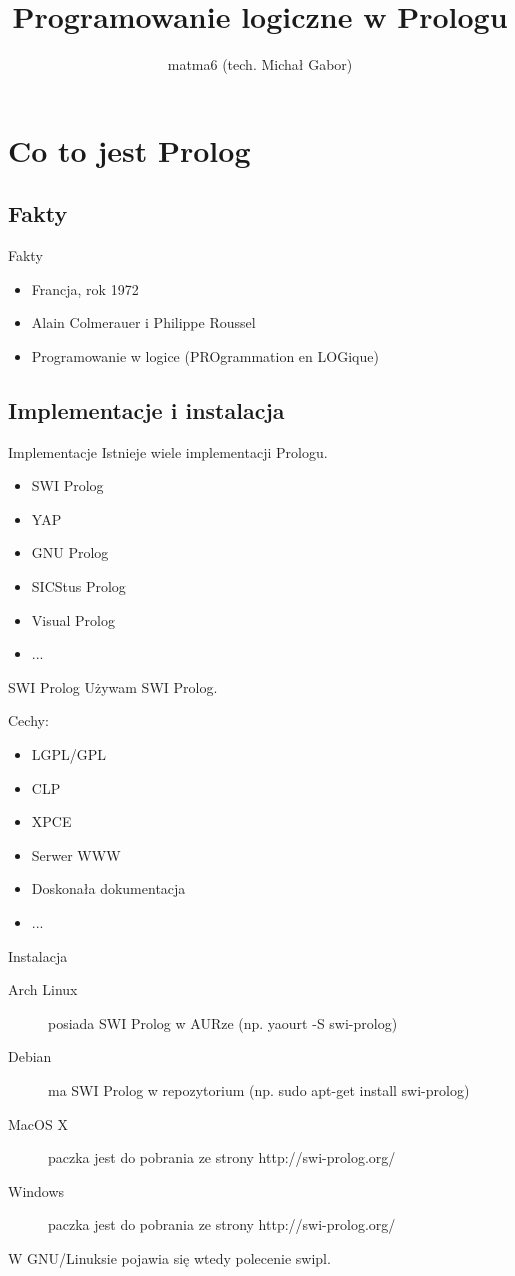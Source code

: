 \documentclass[blue]{beamer}
\author{matma6 (tech. Michał Gabor)}
\title{Programowanie logiczne w Prologu}
\begin{document}
\begin{frame}
\titlepage
\end{frame}
\begin{frame}
\tableofcontents
\end{frame}
\section{Co to jest Prolog}
\subsection{Fakty}
\begin{frame}{Fakty}
\begin{itemize}
\item Francja, rok 1972
\item Alain Colmerauer i Philippe Roussel
\item Programowanie w logice (PROgrammation en LOGique)
\end{itemize}
\end{frame}
\subsection{Implementacje i instalacja}
\begin{frame}{Implementacje}
Istnieje wiele implementacji Prologu.
\begin{itemize}
\item SWI Prolog
\item YAP
\item GNU Prolog
\item SICStus Prolog
\item Visual Prolog
\item ...
\end{itemize}
\end{frame}
\begin{frame}{SWI Prolog}
Używam SWI Prolog.

Cechy:
\begin{itemize}
\item LGPL/GPL
\item CLP
\item XPCE
\item Serwer WWW
\item Doskonała dokumentacja
\item ...
\end{itemize}
\end{frame}
\begin{frame}{Instalacja}
\begin{description}
\item[Arch Linux] posiada SWI Prolog w AURze (np. yaourt -S swi-prolog)
\item[Debian] ma SWI Prolog w repozytorium (np. sudo apt-get install swi-prolog)
\item[MacOS X] paczka jest do pobrania ze strony http://swi-prolog.org/
\item[Windows] paczka jest do pobrania ze strony http://swi-prolog.org/
\end{description}

W GNU/Linuksie pojawia się wtedy polecenie swipl.
\end{frame}
\end{document}
